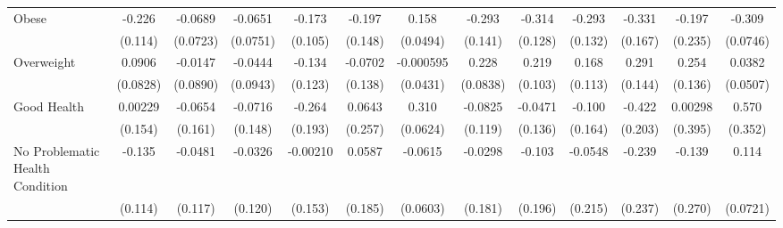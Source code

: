 {\begin{tabular}{l*{12}{c}}
\addlinespace
Obese       &      -0.226\sym{*}  &     -0.0689         &     -0.0651         &      -0.173         &      -0.197         &       0.158\sym{**} &      -0.293\sym{*}  &      -0.314\sym{*}  &      -0.293\sym{*}  &      -0.331\sym{*}  &      -0.197         &      -0.309\sym{***}\\
            &     (0.114)         &    (0.0723)         &    (0.0751)         &     (0.105)         &     (0.148)         &    (0.0494)         &     (0.141)         &     (0.128)         &     (0.132)         &     (0.167)         &     (0.235)         &    (0.0746)         \\
\addlinespace
Overweight  &      0.0906         &     -0.0147         &     -0.0444         &      -0.134         &     -0.0702         &   -0.000595         &       0.228\sym{**} &       0.219\sym{*}  &       0.168         &       0.291\sym{*}  &       0.254         &      0.0382         \\
            &    (0.0828)         &    (0.0890)         &    (0.0943)         &     (0.123)         &     (0.138)         &    (0.0431)         &    (0.0838)         &     (0.103)         &     (0.113)         &     (0.144)         &     (0.136)         &    (0.0507)         \\
\addlinespace
Good Health &     0.00229         &     -0.0654         &     -0.0716         &      -0.264         &      0.0643         &       0.310\sym{***}&     -0.0825         &     -0.0471         &      -0.100         &      -0.422\sym{*}  &     0.00298         &       0.570         \\
            &     (0.154)         &     (0.161)         &     (0.148)         &     (0.193)         &     (0.257)         &    (0.0624)         &     (0.119)         &     (0.136)         &     (0.164)         &     (0.203)         &     (0.395)         &     (0.352)         \\
\addlinespace
No Problematic Health Condition&      -0.135         &     -0.0481         &     -0.0326         &    -0.00210         &      0.0587         &     -0.0615         &     -0.0298         &      -0.103         &     -0.0548         &      -0.239         &      -0.139         &       0.114         \\
            &     (0.114)         &     (0.117)         &     (0.120)         &     (0.153)         &     (0.185)         &    (0.0603)         &     (0.181)         &     (0.196)         &     (0.215)         &     (0.237)         &     (0.270)         &    (0.0721)         \\

\end{tabular}}
